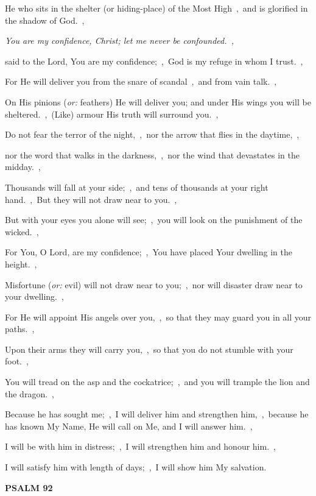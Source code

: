 \documentclass[12pt,twoside,a5paper]{article}
\newcommand{\psalm}[1]{\textbf{PSALM {#1}}\nopagebreak}
\newcommand{\qanona}[1]{{\liturgicalhint{Qanona.} \emph{#1}}}
\newcommand{\translationoption}[1]{\emph{or:} #1}
\begin{document}
\begin{normalparskip}
  He who sits in the shelter (or hiding-place) of the Most High~\sep\ and is glorified in the shadow of God.~\sep

  \qanona{You are my confidence, Christ; let me never be confounded.~\sep}

  said to the Lord, You are my confidence;~\sep\ God is my refuge in whom I trust.~\sep

  For He will deliver you from the snare of scandal~\sep\ and from vain talk.~\sep

  On His pinions (\translationoption{feathers}) He will deliver you; and under His wings you will be sheltered.~\sep\ (Like) armour His truth will surround you.~\sep

  Do not fear the terror of the night,~\sep\ nor the arrow that flies in the daytime,~\sep

  nor the word that walks in the darkness,~\sep\ nor the wind that devastates in the midday.~\sep

  Thousands will fall at your side;~\sep\ and tens of thousands at your right hand.~\sep\ But they will not draw near to you.~\sep

  But with your eyes you alone will see;~\sep\ you will look on the punishment of the wicked.~\sep

  For You, O Lord, are my confidence;~\sep\ You have placed Your dwelling in the height.~\sep

  Misfortune (\translationoption{evil}) will not draw near to you;~\sep\ nor will disaster draw near to your dwelling.~\sep

  For He will appoint His angels over you,~\sep\ so that they may guard you in all your paths.~\sep

  Upon their arms they will carry you,~\sep\ so that you do not stumble with your foot.~\sep

  You will tread on the asp and the cockatrice;~\sep\ and you will trample the lion and the dragon.~\sep

  Because he has sought me;~\sep\ I will deliver him and strengthen him,~\sep\ because he has known My Name, He will call on Me, and I will answer him.~\sep

  I will be with him in distress;~\sep\ I will strengthen him and honour him.~\sep

  I will satisfy him with length of days;~\sep\ I will show him My salvation.
\end{normalparskip}

\psalm{92}
\end{document}
